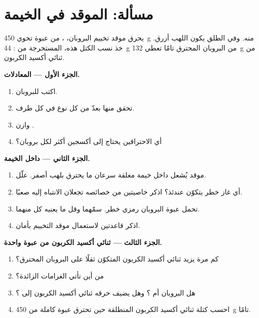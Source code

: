 \section{مسألة: الموقد في الخيمة}

\begin{problem}
\label{pb:g8:combustion-and-fuels:1}
يحرق موقد تخييم البروبان، ، من عبوة تحوي
\qty{450}{g} منه. وفي  الطلق يكون اللهب أزرق. خذ نسب الكتل هذه،
المستخرجة من : \qty{44}{g} من البروبان المحترق 
تامًا تعطي \qty{132}{g} من ثنائي أكسيد الكربون.

\medskip
\noindent\textbf{الجزء الأول --- المعادلات.}
\begin{enumerate}
  \item اكتب  
        للبروبان.
  \item تحقق منها بعدّ  من كل نوع في كل طرف.
  \item وازن 
        . %
  \item أي الاحتراقين يحتاج إلى أكسجين أكثر لكل  بروبان؟
\end{enumerate}

\medskip
\noindent\textbf{الجزء الثاني --- داخل الخيمة.}
\begin{enumerate}[resume]
  \item موقد يُشعل داخل خيمة مغلقة سرعان ما يحترق بلهب أصفر.
        علّل.
  \item أي غاز خطر يتكوّن عندئذ؟ اذكر خاصيتين من خصائصه تجعلان
        الانتباه إليه صعبًا.
  \item تحمل عبوة البروبان رمزي خطر. سمّهما وقل
        ما يعنيه كل منهما.
  \item اذكر قاعدتين لاستعمال موقد التخييم بأمان.
\end{enumerate}

\medskip
\noindent\textbf{الجزء الثالث --- ثنائي أكسيد الكربون من عبوة واحدة.}
\begin{enumerate}[resume]
  \item كم مرة يزيد ثنائي أكسيد الكربون المتكوّن ثقلًا على البروبان
        المحترق؟
  \item من أين تأتي الغرامات الزائدة؟
  \item هل البروبان  أم ؟ وهل يضيف حرقه ثنائي
        أكسيد الكربون إلى ؟
  \item احسب كتلة ثنائي أكسيد الكربون المنطلقة حين تحترق عبوة كاملة من
        \qty{450}{g}  تامًا.
\end{enumerate}
\end{problem}

